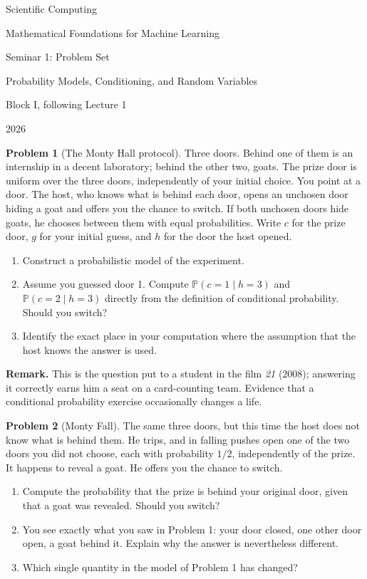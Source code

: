 \documentclass[11pt,a4paper]{article}
\newcommand{\Prob}{\mathbb P}
\newcommand{\problem}[2]{\par\addvspace{6pt}\textbf{Problem #1} (#2). }
\begin{document}
\hypersetup{pageanchor=false}
\begin{titlepage}
\centering
\vspace*{12mm}
{\Huge Scientific Computing\par}
\vspace{5mm}
{\large Mathematical Foundations for Machine Learning\par}
\vspace{24mm}
{\LARGE Seminar 1: Problem Set\par}
\vspace{4mm}
{\large Probability Models, Conditioning, and Random Variables\par}
\vspace{12mm}
{\large Block I, following Lecture 1\par}
\vfill
{\large 2026\par}
\end{titlepage}
\setcounter{page}{1}
\hypersetup{pageanchor=true}

\problem{1}{The Monty Hall protocol}
Three doors. Behind one of them is an internship in a decent laboratory;
behind the other two, goats. The prize door is uniform over the three doors,
independently of your initial choice. You point at a door. The host, who
knows what is behind each door, opens an unchosen door hiding a goat and
offers you the chance to switch. If both unchosen doors hide goats, he
chooses between them with equal probabilities. Write \(c\) for the prize
door, \(g\) for your initial guess, and \(h\) for the door the host opened.
\begin{enumerate}
\item Construct a probabilistic model of the experiment.
\item Assume you guessed door 1. Compute \(\Prob(c=1\mid h=3)\) and
\(\Prob(c=2\mid h=3)\) directly from the definition of conditional
probability. Should you switch?
\item Identify the exact place in your computation where the assumption
that the host knows the answer is used.
\end{enumerate}
\textbf{Remark.} This is the question put to a student in the film
\emph{21} (2008); answering it correctly earns him a seat on a card-counting
team. Evidence that a conditional probability exercise occasionally changes a life.

\problem{2}{Monty Fall}
The same three doors, but this time the host does not know what is behind
them. He trips, and in falling pushes open one of the two doors you did
not choose, each with probability \(1/2\), independently of the prize.
It happens to reveal a goat. He offers you the chance to switch.
\begin{enumerate}
\item Compute the probability that the prize is behind your original door,
given that a goat was revealed. Should you switch?
\item You see exactly what you saw in Problem 1: your door closed, one
other door open, a goat behind it. Explain why the answer is nevertheless different.
\item Which single quantity in the model of Problem 1 has changed?
\end{enumerate}
\end{document}
